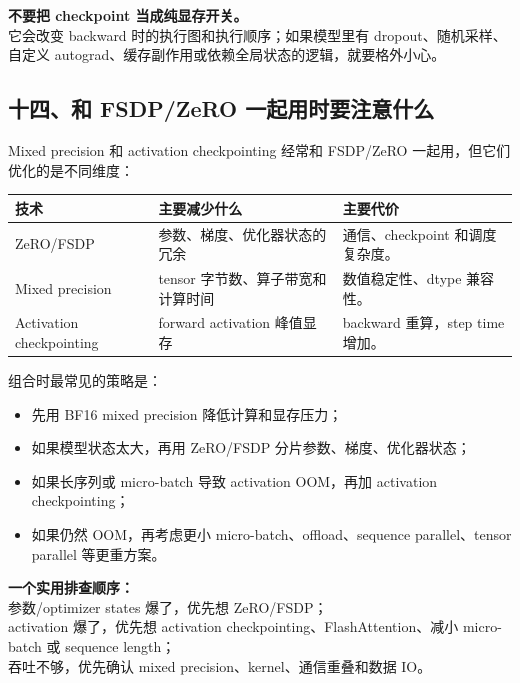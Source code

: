 \begin{warnbox}
\textbf{不要把 checkpoint 当成纯显存开关。}\\
它会改变 backward 时的执行图和执行顺序；如果模型里有 dropout、随机采样、自定义 autograd、缓存副作用或依赖全局状态的逻辑，就要格外小心。
\end{warnbox}

\subsection{十四、和 FSDP/ZeRO 一起用时要注意什么}

Mixed precision 和 activation checkpointing 经常和 FSDP/ZeRO 一起用，但它们优化的是不同维度：

\begin{center}
{\small
\begin{tabular}{p{3.5cm}p{4.2cm}p{4.8cm}}
\hline
\textbf{技术} & \textbf{主要减少什么} & \textbf{主要代价} \\
\hline
ZeRO/FSDP & 参数、梯度、优化器状态的冗余 & 通信、checkpoint 和调度复杂度。 \\
Mixed precision & tensor 字节数、算子带宽和计算时间 & 数值稳定性、dtype 兼容性。 \\
Activation checkpointing & forward activation 峰值显存 & backward 重算，step time 增加。 \\
\hline
\end{tabular}
}
\end{center}

组合时最常见的策略是：

\begin{itemize}[leftmargin=1.5em]
  \item 先用 BF16 mixed precision 降低计算和显存压力；
  \item 如果模型状态太大，再用 ZeRO/FSDP 分片参数、梯度、优化器状态；
  \item 如果长序列或 micro-batch 导致 activation OOM，再加 activation checkpointing；
  \item 如果仍然 OOM，再考虑更小 micro-batch、offload、sequence parallel、tensor parallel 等更重方案。
\end{itemize}

\begin{summarybox}
\textbf{一个实用排查顺序：}\\
参数/optimizer states 爆了，优先想 ZeRO/FSDP；\\
activation 爆了，优先想 activation checkpointing、FlashAttention、减小 micro-batch 或 sequence length；\\
吞吐不够，优先确认 mixed precision、kernel、通信重叠和数据 IO。
\end{summarybox}


